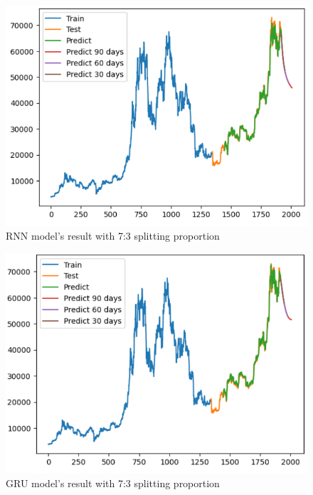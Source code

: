 \documentclass{ieeeojies}
\begin{document}
\begin{figure}[H]
	\centering
	\begin{minipage}{0.6\linewidth}
		\centering
		\includegraphics[width=\linewidth]{bibliography/Images/RNN_BTC_73.PNG}
		\caption{RNN model's result with 7:3 splitting proportion}
	\end{minipage}
\end{figure}
\begin{figure}[H]
	\centering
	\begin{minipage}{0.6\linewidth}
		\centering
		\includegraphics[width=\linewidth]{bibliography/Images/GRU_BTC_73.PNG}
		\caption{GRU model's result with 7:3 splitting proportion}
	\end{minipage}
\end{figure}
\end{document}
